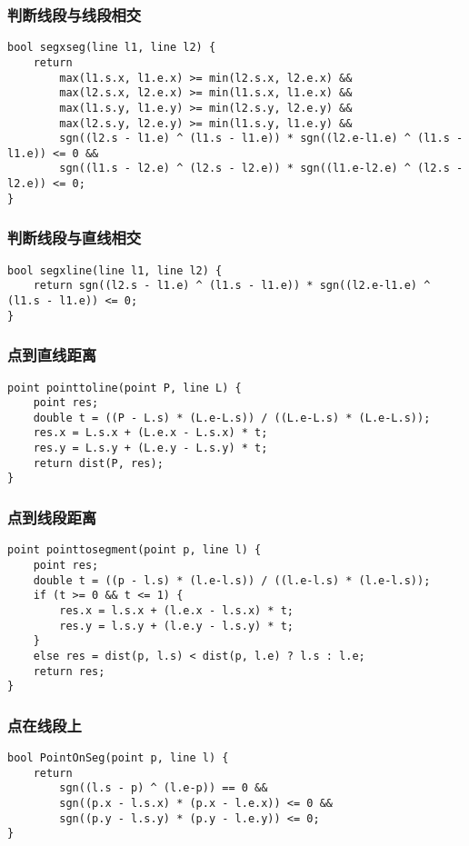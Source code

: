 \documentclass[a4]{article}
\begin{document}
\subsubsection{判断线段与线段相交}
\begin{lstlisting}
bool segxseg(line l1, line l2) {
    return
        max(l1.s.x, l1.e.x) >= min(l2.s.x, l2.e.x) &&
        max(l2.s.x, l2.e.x) >= min(l1.s.x, l1.e.x) &&
        max(l1.s.y, l1.e.y) >= min(l2.s.y, l2.e.y) &&
        max(l2.s.y, l2.e.y) >= min(l1.s.y, l1.e.y) &&
        sgn((l2.s - l1.e) ^ (l1.s - l1.e)) * sgn((l2.e-l1.e) ^ (l1.s - l1.e)) <= 0 &&
        sgn((l1.s - l2.e) ^ (l2.s - l2.e)) * sgn((l1.e-l2.e) ^ (l2.s - l2.e)) <= 0;
}
\end{lstlisting}
\subsubsection{判断线段与直线相交}
\begin{lstlisting}
bool segxline(line l1, line l2) {
	return sgn((l2.s - l1.e) ^ (l1.s - l1.e)) * sgn((l2.e-l1.e) ^ (l1.s - l1.e)) <= 0;
}
\end{lstlisting}
\subsubsection{点到直线距离}
\begin{lstlisting}
point pointtoline(point P, line L) {
	point res;
	double t = ((P - L.s) * (L.e-L.s)) / ((L.e-L.s) * (L.e-L.s)); 
	res.x = L.s.x + (L.e.x - L.s.x) * t;
	res.y = L.s.y + (L.e.y - L.s.y) * t;
	return dist(P, res);
}
\end{lstlisting}
\subsubsection{点到线段距离}
\begin{lstlisting}
point pointtosegment(point p, line l) {
	point res;
	double t = ((p - l.s) * (l.e-l.s)) / ((l.e-l.s) * (l.e-l.s));
	if (t >= 0 && t <= 1) {
		res.x = l.s.x + (l.e.x - l.s.x) * t;
		res.y = l.s.y + (l.e.y - l.s.y) * t;
	}
	else res = dist(p, l.s) < dist(p, l.e) ? l.s : l.e;
	return res;
}
\end{lstlisting}
\subsubsection{点在线段上}
\begin{lstlisting}
bool PointOnSeg(point p, line l) {
	return
	    sgn((l.s - p) ^ (l.e-p)) == 0 &&
	    sgn((p.x - l.s.x) * (p.x - l.e.x)) <= 0 &&
	    sgn((p.y - l.s.y) * (p.y - l.e.y)) <= 0;
}
\end{lstlisting}
\end{document}
